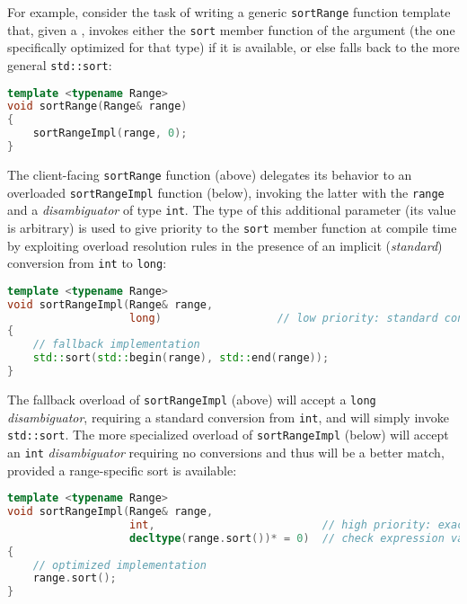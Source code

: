 For example, consider the task of writing a generic \lstinline!sortRange!
function template that, given a , invokes either the
\lstinline!sort! member function of the argument (the one specifically
optimized for that type) if it is available, or else falls back to the more
general \lstinline!std::sort!:

\begin{lstlisting}[language=C++]
template <typename Range>
void sortRange(Range& range)
{
    sortRangeImpl(range, 0);
}
\end{lstlisting}

\noindent The client-facing \lstinline!sortRange! function (above) delegates its
behavior to an overloaded \lstinline!sortRangeImpl! function (below),
invoking the latter with the \lstinline!range! and a \emph{disambiguator}
of type \lstinline!int!. The type of this additional parameter (its value
is arbitrary) is used to give priority to the \lstinline!sort! member
function at compile time by exploiting overload resolution rules in
the presence of an implicit (\emph{standard}) conversion from
\lstinline!int! to \lstinline!long!:

\begin{lstlisting}[language=C++]
template <typename Range>
void sortRangeImpl(Range& range,
                   long)                  // low priority: standard conversion
{
    // fallback implementation
    std::sort(std::begin(range), std::end(range));
}
\end{lstlisting}

\noindent The fallback overload of \lstinline!sortRangeImpl! (above) will accept a
\lstinline!long! \emph{disambiguator}, requiring a standard conversion from
\lstinline!int!, and will simply invoke \lstinline!std::sort!. The more
specialized overload of \lstinline!sortRangeImpl! (below) will accept an
\lstinline!int! \emph{disambiguator} requiring no conversions and thus
will be a better match, provided a range-specific sort is available:

\begin{lstlisting}[language=C++]
template <typename Range>
void sortRangeImpl(Range& range,
                   int,                          // high priority: exact match
                   decltype(range.sort())* = 0)  // check expression validity
{
    // optimized implementation
    range.sort();
}
\end{lstlisting}

